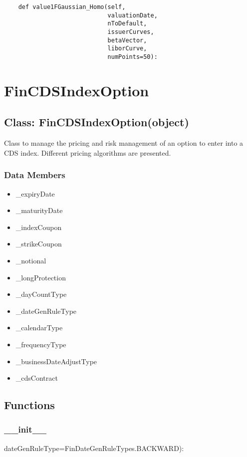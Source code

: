\documentclass[twoside,11pt]{book}
\begin{document}
\begin{lstlisting}
    def value1FGaussian_Homo(self,
                             valuationDate,
                             nToDefault,
                             issuerCurves,
                             betaVector,
                             liborCurve,
                             numPoints=50):
\end{lstlisting}

\newpage
\section{FinCDSIndexOption}

\subsection*{Class: FinCDSIndexOption(object)}
Class to manage the pricing and risk management of an option to enter into a CDS index. Different pricing algorithms are presented. 

\subsubsection*{Data Members}
\begin{itemize}
\item{\_expiryDate}
\item{\_maturityDate}
\item{\_indexCoupon}
\item{\_strikeCoupon}
\item{\_notional}
\item{\_longProtection}
\item{\_dayCountType}
\item{\_dateGenRuleType}
\item{\_calendarType}
\item{\_frequencyType}
\item{\_businessDateAdjustType}
\item{\_cdsContract}
\end{itemize}

\subsection*{Functions}

\subsubsection*{{\bf \_\_init\_\_}}
dateGenRuleType=FinDateGenRuleTypes.BACKWARD): 
\end{document}
